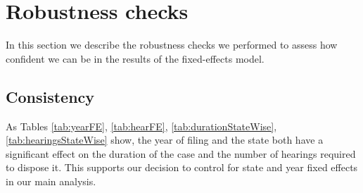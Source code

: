 \pagebreak

\section{Robustness checks}\label{sec:robustness}
In this section we describe the robustness checks we performed to assess how confident we can be in the results of the fixed-effects model.

\subsection{Consistency}
\label{sec:consistency}
As Tables \ref{tab:yearFE}, \ref{tab:hearFE}, \ref{tab:durationStateWise}, \ref{tab:hearingsStateWise} show, the year of filing and the state both have a significant effect on the duration of the case and the number of hearings required to dispose it. This supports our decision to control for state and year fixed effects in our main analysis.


